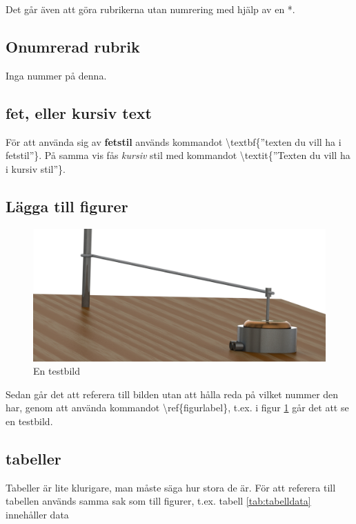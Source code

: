 \documentclass[12pt, a4paper]{article}
\begin{document}
Det går även att göra rubrikerna utan numrering med hjälp av en *.

\subsection*{Onumrerad rubrik}
Inga nummer på denna.

\subsection{fet, eller kursiv text}

För att använda sig av \textbf{fetstil} används kommandot \textbackslash textbf\{''texten du vill ha i fetstil''\}. På samma vis fås \textit{kursiv} stil 
med kommandot \textbackslash textit\{''Texten du vill ha i kursiv stil''\}.

\subsection{Lägga till figurer}

\begin{figure}[H]
	\centering
	\includegraphics[width=0.5\linewidth]{test.JPG}
	\caption{En testbild}
	\label{fig:test}
\end{figure}

Sedan går det att referera till bilden utan att hålla reda på vilket nummer den har, genom att använda kommandot \textbackslash ref\{figurlabel\}, t.ex.
i figur \ref{fig:test} går det att se en testbild.

\subsection{tabeller}
Tabeller är lite klurigare, man måste säga hur stora de är. För att referera till tabellen används samma sak som till figurer, t.ex. tabell \ref{tab:tabelldata} innehåller data
\end{document}
